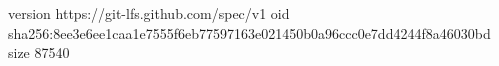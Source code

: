version https://git-lfs.github.com/spec/v1
oid sha256:8ee3e6ee1caa1e7555f6eb77597163e021450b0a96ccc0e7dd4244f8a46030bd
size 87540
